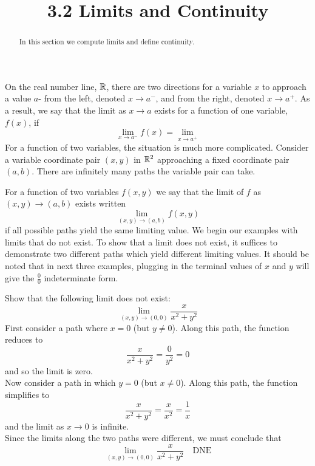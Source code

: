 \documentclass[handout]{ximera}
\title{3.2 Limits and Continuity}
\begin{document}
\begin{abstract}
In this section we compute limits and define continuity.
\end{abstract}

\maketitle

On the real number line, $\mathbb R$, there are two directions for a variable $x$ to approach a value $a$- from 
the left, denoted $x \to a^-$, and from the right, denoted $x \to a^+$.
As a result, we say that the limit as $x \to a$ exists for a function of one variable, $f(x)$, if
\[
\lim_{x \to a^-} f(x) = \lim_{x \to a^+}
\]
For a function of two variables, the situation is much more complicated. Consider a variable coordinate pair $(x, y)$ in $\mathbb R^2$
approaching a fixed coordinate pair $(a,b)$.  There are infinitely many paths the variable pair can take.

\begin{image}
\end{image} 

For a function of two variables $f(x,y)$ we say that the limit of $f$ as $(x, y) \to (a,b)$ exists written
\[
\lim_{(x,y) \to (a,b)} f(x,y)
\]
if all possible paths yield the same limiting value. We begin our examples with limits that do not exist. 
To show that a limit does not exist, it suffices to demonstrate two different paths which yield different limiting values.
It should be noted that in next three examples, plugging in the terminal values of $x$ and $y$ will give the $\frac00$ indeterminate form.

\begin{example}[Example 1]
Show that the following limit does not exist:
\[
\lim_{(x,y) \to (0,0)} \frac{x}{x^2 + y^2}
\]
First consider a path where $x = 0$ (but $y \neq 0$). Along this path, the function reduces to
\[
\frac{x}{x^2 + y^2} = \frac{0}{y^2} = 0
\]
and so the limit is zero.\\
Now consider a path in which $y = 0$ (but $x \neq 0$). Along this path, the function simplifies to
\[
\frac{x}{x^2 + y^2} = \frac{x}{x^2} = \frac{1}{x}
\]
and the limit as $x \to 0$ is infinite.\\
Since the limits along the two paths were different, we must conclude that
\[
\lim_{(x,y) \to (0,0)} \frac{x}{x^2 + y^2} \quad \text{DNE}
\]
\end{example}
\end{document}
